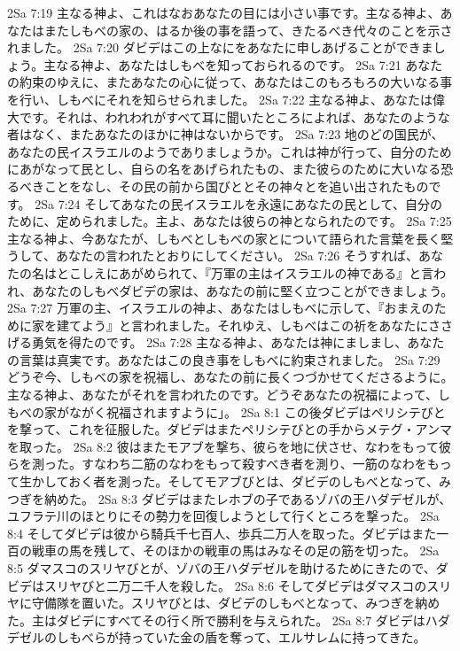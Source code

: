 2Sa 7:19  主なる神よ、これはなおあなたの目には小さい事です。主なる神よ、あなたはまたしもべの家の、はるか後の事を語って、きたるべき代々のことを示されました。
2Sa 7:20  ダビデはこの上なにをあなたに申しあげることができましょう。主なる神よ、あなたはしもべを知っておられるのです。
2Sa 7:21  あなたの約束のゆえに、またあなたの心に従って、あなたはこのもろもろの大いなる事を行い、しもべにそれを知らせられました。
2Sa 7:22  主なる神よ、あなたは偉大です。それは、われわれがすべて耳に聞いたところによれば、あなたのような者はなく、またあなたのほかに神はないからです。
2Sa 7:23  地のどの国民が、あなたの民イスラエルのようでありましょうか。これは神が行って、自分のためにあがなって民とし、自らの名をあげられたもの、また彼らのために大いなる恐るべきことをなし、その民の前から国びととその神々とを追い出されたものです。
2Sa 7:24  そしてあなたの民イスラエルを永遠にあなたの民として、自分のために、定められました。主よ、あなたは彼らの神となられたのです。
2Sa 7:25  主なる神よ、今あなたが、しもべとしもべの家とについて語られた言葉を長く堅うして、あなたの言われたとおりにしてください。
2Sa 7:26  そうすれば、あなたの名はとこしえにあがめられて、『万軍の主はイスラエルの神である』と言われ、あなたのしもべダビデの家は、あなたの前に堅く立つことができましょう。
2Sa 7:27  万軍の主、イスラエルの神よ、あなたはしもべに示して、『おまえのために家を建てよう』と言われました。それゆえ、しもべはこの祈をあなたにささげる勇気を得たのです。
2Sa 7:28  主なる神よ、あなたは神にましまし、あなたの言葉は真実です。あなたはこの良き事をしもべに約束されました。
2Sa 7:29  どうぞ今、しもべの家を祝福し、あなたの前に長くつづかせてくださるように。主なる神よ、あなたがそれを言われたのです。どうぞあなたの祝福によって、しもべの家がながく祝福されますように」。
2Sa 8:1  この後ダビデはペリシテびとを撃って、これを征服した。ダビデはまたペリシテびとの手からメテグ・アンマを取った。
2Sa 8:2  彼はまたモアブを撃ち、彼らを地に伏させ、なわをもって彼らを測った。すなわち二筋のなわをもって殺すべき者を測り、一筋のなわをもって生かしておく者を測った。そしてモアブびとは、ダビデのしもべとなって、みつぎを納めた。
2Sa 8:3  ダビデはまたレホブの子であるゾバの王ハダデゼルが、ユフラテ川のほとりにその勢力を回復しようとして行くところを撃った。
2Sa 8:4  そしてダビデは彼から騎兵千七百人、歩兵二万人を取った。ダビデはまた一百の戦車の馬を残して、そのほかの戦車の馬はみなその足の筋を切った。
2Sa 8:5  ダマスコのスリヤびとが、ゾバの王ハダデゼルを助けるためにきたので、ダビデはスリヤびと二万二千人を殺した。
2Sa 8:6  そしてダビデはダマスコのスリヤに守備隊を置いた。スリヤびとは、ダビデのしもべとなって、みつぎを納めた。主はダビデにすべてその行く所で勝利を与えられた。
2Sa 8:7  ダビデはハダデゼルのしもべらが持っていた金の盾を奪って、エルサレムに持ってきた。
